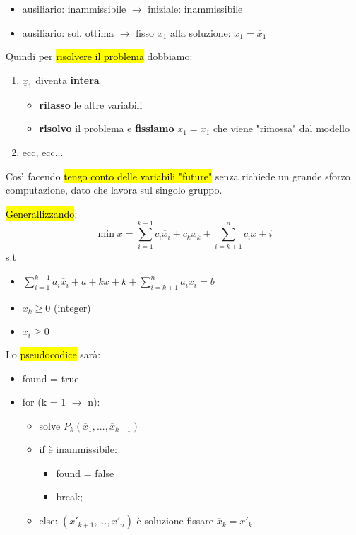 \begin{itemize}
    \item ausiliario: inammissibile $\to$ iniziale: inammissibile
    \item ausiliario: sol. ottima $\to$ fisso $x_1$ alla soluzione: $x_1 = \overline{x}_1$
\end{itemize}

Quindi per \hl{risolvere il problema} dobbiamo:

\begin{enumerate}
    \item $\underline{x}_1$ diventa \textbf{intera}
    \begin{itemize}
        \item \textbf{rilasso} le altre variabili
        \item \textbf{risolvo} il problema e \textbf{fissiamo} $x_1 = \overline{x}_1$ che viene "rimossa" dal modello
    \end{itemize}

    \item ecc, ecc...
\end{enumerate}

Così facendo \hl{tengo conto delle variabili "future"} senza richiede un grande sforzo computazione, dato che lavora sul singolo gruppo.

\hl{Generallizzando}:
$$\min x = \sum_{i=1}^{k-1} c_i \overline{x}_i + c_k x_k + \sum_{i=k+1}^n c_i x+i$$
s.t

\begin{itemize}
    \item $\sum_{i=1}^{k-1} a_i \overline{x}_i + a+k x+k + \sum_{i=k+1}^n a_i x_i = b$
    \item $x_k \geq 0$ (integer)
    \item $x_i \geq 0$
\end{itemize}

Lo \hl{pseudocodice} sarà:

\begin{itemize}
    \item[] found = true
    \item[] for (k = 1 $\to$ n):
    \begin{itemize}
        \item[] solve $P_k(\overline{x}_1,...,\overline{x}_{k-1})$
        \item[] if è inammissibile:
        \begin{itemize}
            \item[] found = false
            \item[] break;
        \end{itemize}
        \item[] else: $(x'_{k+1},...,x'_n)$ è soluzione
        fissare $\overline{x}_k = x'_{k}$
    \end{itemize}
\end{itemize}


